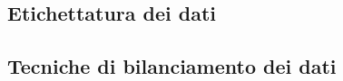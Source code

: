 









\subsection{Etichettatura dei dati} %



\subsection{Tecniche di bilanciamento dei dati} %





